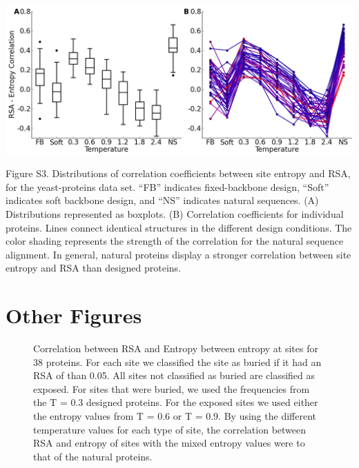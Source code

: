 \documentclass[12pt]{article}
\makeatletter
\newcommand{\customlabel}[2]{%
\protected@write \@auxout {}{\string \newlabel {#1}{{#2}{}}}}
\makeatother
\begin{document}
\centerline{\includegraphics[width = 6in]{figures/Cor_Mean_Entropy_RSA_Combination_Plot_Noah.png}}
\noindent Figure S3. Distributions of correlation coefficients between site entropy and RSA, for the yeast-proteins data set. ``FB'' indicates fixed-backbone design, ``Soft'' indicates soft backbone design, and ``NS'' indicates natural sequences. (A) Distributions represented as boxplots. (B) Correlation coefficients for individual proteins. Lines connect identical structures in the different design conditions. The color shading represents the strength of the correlation for the natural sequence alignment. In general, natural proteins display a stronger correlation between site entropy and RSA than designed proteins.

\customlabel{Correlation_figure_Noah}{S3}


\cleardoublepage

\section{Other Figures}




\begin{figure}[H]
\caption{Correlation between RSA and Entropy between entropy at sites for 38 proteins. For each site we classified the site as buried if it had an RSA of than 0.05. All sites not classified as buried are classified as exposed. For sites that were buried, we used the frequencies from the T = 0.3 designed proteins. For the exposed sites we used either the entropy values from T = 0.6 or T = 0.9. By using the different temperature values for each type of site, the correlation between RSA and entropy of sites with the mixed entropy values were to that of the natural proteins.}
\label{Mixed_RSA_Entropy_Duncan}
\end{figure}
\end{document}
